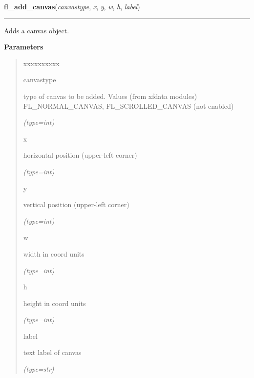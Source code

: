 \hspace{.8\funcindent}\begin{boxedminipage}{\funcwidth}

    \raggedright \textbf{fl\_add\_canvas}(\textit{canvastype}, \textit{x}, \textit{y}, \textit{w}, \textit{h}, \textit{label})

    \vspace{-1.5ex}

    \rule{\textwidth}{0.5\fboxrule}
\setlength{\parskip}{2ex}
    Adds a canvas object.

\setlength{\parskip}{1ex}
      \textbf{Parameters}
      \vspace{-1ex}

      \begin{quote}
        \begin{Ventry}{xxxxxxxxxx}

          \item[canvastype]

          type of canvas to be added. Values (from xfdata modules) 
          FL\_NORMAL\_CANVAS, FL\_SCROLLED\_CANVAS (not enabled)

            {\it (type=int)}

          \item[x]

          horizontal position (upper-left corner)

            {\it (type=int)}

          \item[y]

          vertical position (upper-left corner)

            {\it (type=int)}

          \item[w]

          width in coord units

            {\it (type=int)}

          \item[h]

          height in coord units

            {\it (type=int)}

          \item[label]

          text label of canvas

            {\it (type=str)}

        \end{Ventry}


\end{quote}
\end{boxedminipage}
